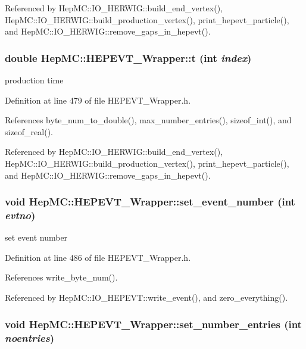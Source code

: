 Referenced by Hep\-MC::IO\_\-HERWIG::build\_\-end\_\-vertex(), Hep\-MC::IO\_\-HERWIG::build\_\-production\_\-vertex(), print\_\-hepevt\_\-particle(), and Hep\-MC::IO\_\-HERWIG::remove\_\-gaps\_\-in\_\-hepevt().
\subsubsection{\setlength{\rightskip}{0pt plus 5cm}double Hep\-MC::HEPEVT\_\-Wrapper::t (int {\em index})\hspace{0.3cm}{\tt  [inline, static]}}\label{classHepMC_1_1HEPEVT__Wrapper_b302ab96378802b5d3549618ed2f063b}


production time 



Definition at line 479 of file HEPEVT\_\-Wrapper.h.

References byte\_\-num\_\-to\_\-double(), max\_\-number\_\-entries(), sizeof\_\-int(), and sizeof\_\-real().

Referenced by Hep\-MC::IO\_\-HERWIG::build\_\-end\_\-vertex(), Hep\-MC::IO\_\-HERWIG::build\_\-production\_\-vertex(), print\_\-hepevt\_\-particle(), and Hep\-MC::IO\_\-HERWIG::remove\_\-gaps\_\-in\_\-hepevt().
\subsubsection{\setlength{\rightskip}{0pt plus 5cm}void Hep\-MC::HEPEVT\_\-Wrapper::set\_\-event\_\-number (int {\em evtno})\hspace{0.3cm}{\tt  [inline, static]}}\label{classHepMC_1_1HEPEVT__Wrapper_0ea889dcd2f54a03e37cd8282aaea8c5}


set event number 



Definition at line 486 of file HEPEVT\_\-Wrapper.h.

References write\_\-byte\_\-num().

Referenced by Hep\-MC::IO\_\-HEPEVT::write\_\-event(), and zero\_\-everything().
\subsubsection{\setlength{\rightskip}{0pt plus 5cm}void Hep\-MC::HEPEVT\_\-Wrapper::set\_\-number\_\-entries (int {\em noentries})\hspace{0.3cm}{\tt  [inline, static]}}\label{classHepMC_1_1HEPEVT__Wrapper_725ffa5dc1e3e838903b45ffcba1270d}


